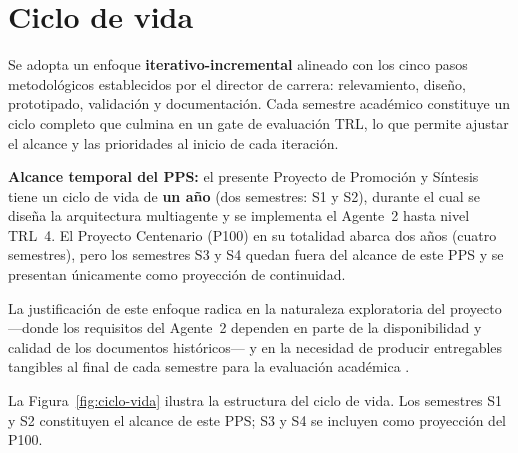 \documentclass[a4paper, 12pt]{article}
\begin{document}
\section{Ciclo de vida}

Se adopta un enfoque \textbf{iterativo-incremental} alineado con los cinco pasos metodol\'ogicos establecidos por el director de carrera: relevamiento, dise\~no, prototipado, validaci\'on y documentaci\'on. Cada semestre acad\'emico constituye un ciclo completo que culmina en un gate de evaluaci\'on \ac{TRL}, lo que permite ajustar el alcance y las prioridades al inicio de cada iteraci\'on.

\textbf{Alcance temporal del PPS:} el presente Proyecto de Promoci\'on y S\'intesis tiene un ciclo de vida de \textbf{un a\~no} (dos semestres: S1 y S2), durante el cual se dise\~na la arquitectura multiagente y se implementa el Agente~2 hasta nivel TRL~4. El Proyecto Centenario (\ac{P100}) en su totalidad abarca dos a\~nos (cuatro semestres), pero los semestres S3 y S4 quedan fuera del alcance de este PPS y se presentan \'unicamente como proyecci\'on de continuidad.

La justificaci\'on de este enfoque radica en la naturaleza exploratoria del proyecto ---donde los requisitos del Agente~2 dependen en parte de la disponibilidad y calidad de los documentos hist\'oricos--- y en la necesidad de producir entregables tangibles al final de cada semestre para la evaluaci\'on acad\'emica \parencite{pressman2019}.

La Figura~\ref{fig:ciclo-vida} ilustra la estructura del ciclo de vida. Los semestres S1 y S2 constituyen el alcance de este PPS; S3 y S4 se incluyen como proyecci\'on del \ac{P100}.
\end{document}
